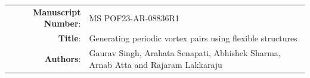 \documentclass[onecolumn,a4paper,amsmath,amssym,pre]{revtex4}
\begin{document}
		
		
		\begin{tabular}{ r | l }
			\hline            
			\textbf{Manuscript Number}:& MS POF23-AR-08836R1 \\	
			\textbf{Title}: & Generating periodic vortex pairs using flexible structures\\
			\textbf{Authors}:  & Gaurav Singh, Arahata Senapati, Abhishek Sharma, Arnab Atta and Rajaram Lakkaraju \\
			\hline  
		\end{tabular}
		\newline
		\vspace{0.5cm}
				
\end{document}
